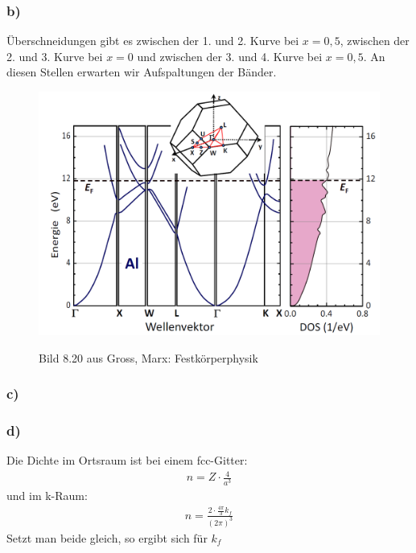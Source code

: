 \subsubsection*{b)}
Überschneidungen gibt es zwischen der 1. und 2. Kurve bei $x = 0,5$, zwischen der
2. und 3. Kurve bei $x = 0$ und zwischen der 3. und 4. Kurve bei $x = 0,5$.
An diesen Stellen erwarten wir Aufspaltungen der Bänder.
\newpage
\begin{figure}
  \centering
  \includegraphics[width=11.5cm]{aufgabe15c.png}
\label{bild15c}
\caption{Bild 8.20 aus Gross, Marx: Festkörperphysik}
\end{figure}
\subsubsection*{c)}
\suppressfloats



\subsubsection*{d)}
Die Dichte im Ortsraum ist bei einem fcc-Gitter:
\begin{align*}
n = Z\cdot\frac{4}{a^3}
\end{align*}
und im k-Raum:
\begin{align*}
n = \frac{2\cdot\frac{4\pi}{3}k_f}{(2\pi)^3}
\end{align*}
Setzt man beide gleich, so ergibt sich für $k_f$

